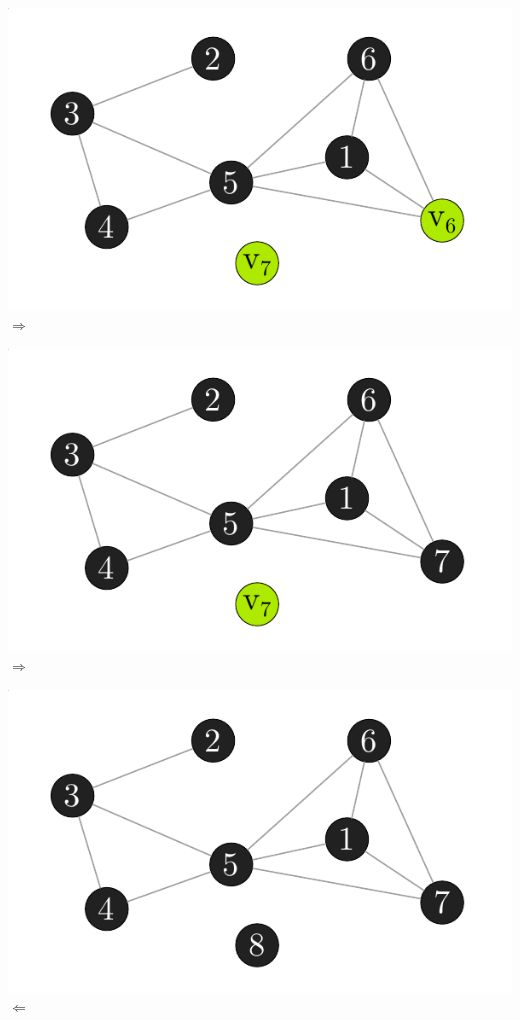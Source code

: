 \documentclass[xcolor=x11names,compress]{beamer}
\begin{document}
\begin{frame}
\begin{overprint}
		\includegraphics[scale=1.0]{img/graph/simplicialconstruction/07.pdf}
		\onslide<9>
		\( \Rightarrow \)

		\includegraphics[scale=1.0]{img/graph/simplicialconstruction/08.pdf}
		\onslide<10>
		\( \Rightarrow \)

		\includegraphics[scale=1.0]{img/graph/simplicialconstruction/09.pdf}
		\onslide<11>
		\( \Leftarrow \)


\end{overprint}
\end{frame}
\end{document}
